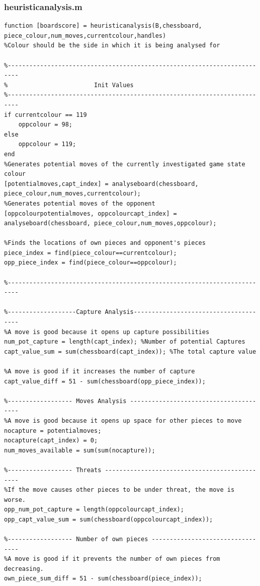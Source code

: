\documentclass[11pt,a4paper]{article}
\begin{document}
\subsubsection{heuristicanalysis.m}
\begin{lstlisting}
function [boardscore] = heuristicanalysis(B,chessboard, piece_colour,num_moves,currentcolour,handles)
%Colour should be the side in which it is being analysed for

%-------------------------------------------------------------------------
%                        Init Values
%-------------------------------------------------------------------------
if currentcolour == 119
    oppcolour = 98;
else
    oppcolour = 119;
end
%Generates potential moves of the currently investigated game state colour
[potentialmoves,capt_index] = analyseboard(chessboard, piece_colour,num_moves,currentcolour);
%Generates potential moves of the opponent
[oppcolourpotentialmoves, oppcolourcapt_index] = analyseboard(chessboard, piece_colour,num_moves,oppcolour);

%Finds the locations of own pieces and opponent's pieces
piece_index = find(piece_colour==currentcolour);
opp_piece_index = find(piece_colour==oppcolour);

%-------------------------------------------------------------------------

%-------------------Capture Analysis--------------------------------------
%A move is good because it opens up capture possibilities
num_pot_capture = length(capt_index); %Number of potential Captures
capt_value_sum = sum(chessboard(capt_index)); %The total capture value

%A move is good if it increases the number of capture 
capt_value_diff = 51 - sum(chessboard(opp_piece_index));

%------------------ Moves Analysis ---------------------------------------
%A move is good because it opens up space for other pieces to move
nocapture = potentialmoves;
nocapture(capt_index) = 0;
num_moves_available = sum(sum(nocapture));

%------------------ Threats ----------------------------------------------
%If the move causes other pieces to be under threat, the move is worse.
opp_num_pot_capture = length(oppcolourcapt_index);
opp_capt_value_sum = sum(chessboard(oppcolourcapt_index)); 

%------------------ Number of own pieces ---------------------------------
%A move is good if it prevents the number of own pieces from decreasing.
own_piece_sum_diff = 51 - sum(chessboard(piece_index)); 



\end{lstlisting}
\end{document}
